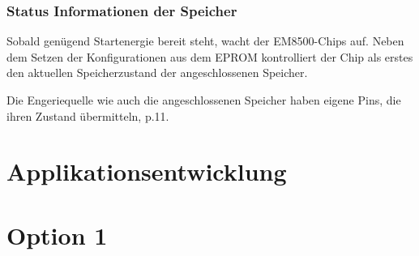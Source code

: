 \subsubsection{Status Informationen der Speicher}

Sobald genügend Startenergie bereit steht, wacht der EM8500-Chips auf. Neben dem Setzen der Konfigurationen aus dem EPROM kontrolliert der Chip als erstes den aktuellen Speicherzustand der angeschlossenen Speicher.

Die Engeriequelle wie auch die angeschlossenen Speicher haben eigene Pins, die ihren Zustand übermitteln\cite{datasheet_EM85}, p.11. 

\section{Applikationsentwicklung}

\section{Option 1}







